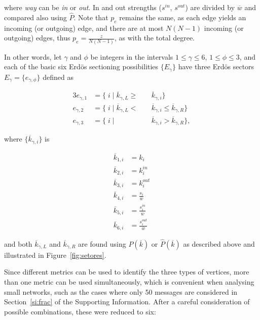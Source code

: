 \noindent where \emph{way} can be \emph{in} or \emph{out}. In and out strengths ($s^{in}$, $s^{out}$) are divided by $\overline{w}$ and compared also using $\hat{P}$. Note that $p_e$ remains the same, as each edge yields an incoming (or outgoing) edge, and there are at most $N(N-1)$ incoming (or outgoing) edges, thus $p_e=\frac{z}{N(N-1)}$, as with the total degree.

In other words, let $\gamma$ and $\phi$ be integers in the intervals $1 \leq \gamma \leq 6$, $1 \leq \phi \leq 3$, and each of the basic six Erd\"os sectioning possibilities $\{E_{\gamma}\}$ have three Erd\"os sectors $E_{\gamma}= \{e_{\gamma, \phi} \}$ defined as

\begin{alignat}{3}\label{eq:part}
e_{\gamma,1}&=\{\;i\;|\;\overline{k}_{\gamma,L}\geq&&\overline{k}_{\gamma,i}\} \nonumber \\
e_{\gamma,2}&=\{\;i\;|\;\overline{k}_{\gamma,L}<\;&&\overline{k}_{\gamma,i}\leq\overline{k}_{\gamma,R}\} \\ 
e_{\gamma,3}&=\{\;i\;|\;&&\overline{k}_{\gamma,i}>\overline{k}_{\gamma,R}\} \nonumber,
\end{alignat}

\noindent where $\{\overline{k}_{\gamma,i}\}$ is

\begin{equation}
\begin{split}
\overline{k}_{1,i}&=k_i \\
\overline{k}_{2,i}&=k_i^{in} \\
\overline{k}_{3,i}&=k_i^{out} \\
\overline{k}_{4,i}&=\frac{s_i}{\overline{w}} \\
\overline{k}_{5,i}&=\frac{s_i^{in}}{\overline{w}} \\
\overline{k}_{6,i}&=\frac{s_i^{out}}{\overline{w}}
\end{split}
\end{equation}

\noindent and both $\overline{k}_{\gamma,L}$ and $\overline{k}_{\gamma,R}$ are found using $P(\overline{k})$ or $\hat{P}(\overline{k})$ as described above and illustrated in Figure~\ref{fig:setores}.

Since different metrics can be used to identify the three types of vertices, more than one metric can be used simultaneously, which is convenient when analysing small networks,
such as the cases where only 50 messages are considered in Section~\ref*{si:frac} of the Supporting Information.
After a careful consideration of possible combinations, these were reduced to six:

